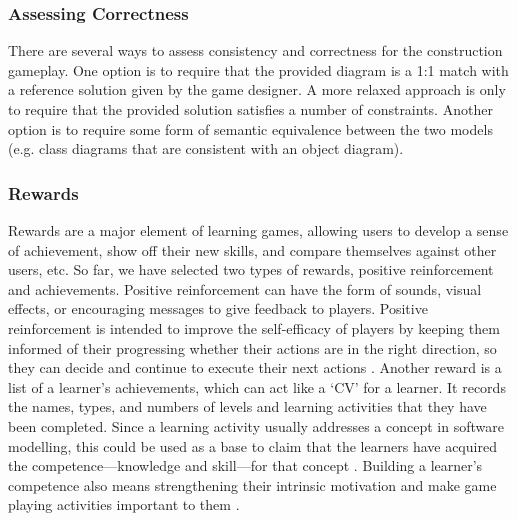 \documentclass[conference]{IEEEtran}
\begin{document}
\subsubsection{Assessing Correctness} 
\label{Assessing Correctness} 
There are several ways to assess consistency and correctness for the construction gameplay. One option is to require that the provided diagram is a 1:1 match with a reference solution given by the game designer. A more relaxed approach is only to require that the provided solution satisfies a number of constraints. Another option is to require some form of semantic equivalence between the two models (e.g. class diagrams that are consistent with an object diagram). 

\subsubsection{Rewards}
\label{Rewards}
Rewards are a major element of learning games, allowing users to develop a sense of achievement, show off their new skills, and compare themselves against other users, etc. So far, we have selected two types of rewards, positive reinforcement and achievements. Positive reinforcement can have the form of sounds, visual effects, or encouraging messages to give feedback to players. Positive reinforcement is intended to improve the self-efficacy of players by keeping them informed of their progressing whether their actions are in the right direction, so they can decide and continue to execute their next actions \cite{richter2015studying}. Another reward is a list of a learner's achievements, which can act like a `CV' for a learner. It records the names, types, and numbers of levels and learning activities that they have been completed. Since a learning activity usually addresses a concept in software modelling, this could be used as a base to claim that the learners have acquired the competence---knowledge and skill---for that concept \cite{richter2015studying}. Building a learner's competence also means strengthening their intrinsic motivation \cite{ryan2017self} and make game playing  activities important to them \cite{nicholson2015recipe}.
\end{document}

